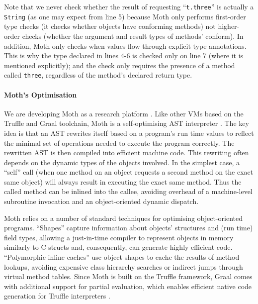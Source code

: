 \documentclass[sigplan,screen]{acmart}
\newcommand{\code}[1]{\texttt{#1}}
\newcommand{\RR}[1]{{\color{red}RR: #1}}
\begin{document}
Note that we never check
whether the result of requesting ``\code{t.three}'' is actually
a \code{String} (as one may expect from line 5) because Moth only performs first-order type checks
(it checks whether objects have conforming methods) not higher-order
checks (whether the argument and result types of methods' conform). In addition, Moth
only checks when values flow through explicit type annotations.
This is why the type declared in lines 4-6 is checked only on line 7
(where it is mentioned explicitly); and the check only requires the
presence of a method called \code{three}, regardless of the method's
declared return type.

\paragraph{Moth's Optimisation}
We are developing Moth as a
research platform \cite{roberts-and-co-ecoop-2019}. Like other VMs
based on the Truffle and Graal toolchain, Moth is a self-optimising
AST interpreter \cite{Wurthinger:2012:SelfOptAST}. 
The key idea is that an AST rewrites itself based on a program's run time values
to reflect the minimal set of operations needed to execute the program
correctly. The rewritten AST is then compiled into efficient machine
code. This rewriting often depends on the dynamic types of the
objects involved. In the simplest case, a ``self'' call (when one method
on an object requests a second method on the exact same object) will
always result in executing the exact same method. Thus the called method can be inlined into
the callee, avoiding overhead of a machine-level subroutine
invocation and an object-oriented dynamic dispatch.


Moth relies on a number of standard techniques for optimising
object-oriented programs.
``Shapes'' \citep{woss2014object} capture information about objects'
structures and (run time) 
field types, allowing a just-in-time compiler to
represent objects in memory similarly to C structs and, consequently,
can generate highly efficient code.
``Polymorphic inline caches''
\citep{Hoelzle:91:PIC} use object shapes to cache the results of
method lookups, avoiding expensive class hierarchy searches or
indirect jumps through virtual method tables. 
Since Moth is built on the Truffle framework,
Graal comes with  additional support for partial evaluation,
which enables efficient native code generation for
Truffle interpreters \citep{Wurthinger:2017:PPE}.
\end{document}
